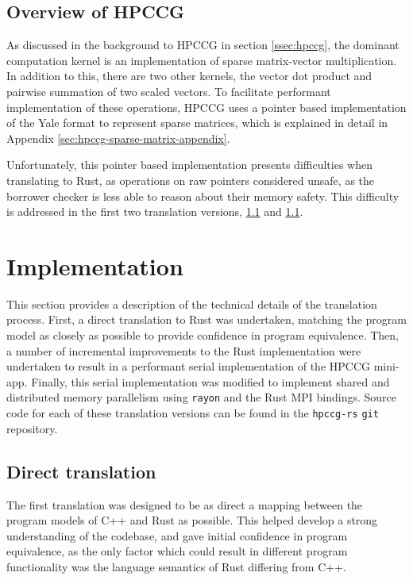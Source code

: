 \subsection{Overview of HPCCG}
\label{sec:overview-hpccg}

As discussed in the background to \acrshort{HPCCG} in section \ref{ssec:hpccg}, the dominant computation kernel is an implementation of sparse matrix-vector multiplication. In addition to this, there are two other kernels, the vector dot product and pairwise summation of two scaled vectors. To facilitate performant implementation of these operations, \acrshort{HPCCG} uses a pointer based implementation of the Yale format to represent sparse matrices, which is explained in detail in Appendix \ref{sec:hpccg-sparse-matrix-appendix}.

Unfortunately, this pointer based implementation presents difficulties when translating to Rust, as operations on raw pointers considered unsafe, as the borrower checker is less able to reason about their memory safety. This difficulty is addressed in the first two translation versions, \ref{sec:translation-direct} and \ref{sec:translation-direct}.

\section{Implementation}
\label{sec:translation-implementation}

This section provides a description of the technical details of the translation process.
First, a direct translation to Rust was undertaken, matching the program model as closely as possible to provide confidence in program equivalence. Then, a number of incremental improvements to the Rust implementation were undertaken to result in a performant serial implementation of the \acrshort{HPCCG} \acrshort{mini-app}. Finally, this serial implementation was modified to implement shared and distributed memory parallelism using \texttt{rayon} and the Rust MPI bindings. Source code for each of these translation versions can be found in the \texttt{hpccg-rs} \texttt{git} repository.


\subsection{Direct translation}
\label{sec:translation-direct}
The first translation was designed to be as direct a mapping between the program models of C++ and Rust as possible. This helped develop a strong understanding of the codebase, and gave initial confidence in program equivalence, as the only factor which could result in different program functionality was the language semantics of Rust differing from C++.

